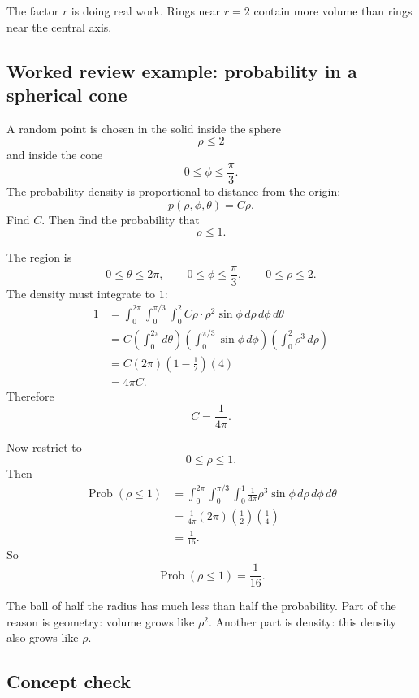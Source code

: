The factor \(r\) is doing real work.  Rings near \(r=2\) contain more volume than rings
near the central axis.

\subsection{Worked review example: probability in a spherical cone}

A random point is chosen in the solid inside the sphere
\[
    \rho\le2
\]
and inside the cone
\[
    0\le\phi\le\frac{\pi}{3}.
\]
The probability density is proportional to distance from the origin:
\[
    p(\rho,\phi,\theta)=C\rho.
\]
Find \(C\).  Then find the probability that
\[
    \rho\le1.
\]

The region is
\[
    0\le\theta\le2\pi,
    \qquad
    0\le\phi\le\frac{\pi}{3},
    \qquad
    0\le\rho\le2.
\]
The density must integrate to \(1\):
\[
\begin{aligned}
1
&=
\int_0^{2\pi}\int_0^{\pi/3}\int_0^2
C\rho\cdot \rho^2\sin\phi\,d\rho\,d\phi\,d\theta\\
&=
C
\left(\int_0^{2\pi}d\theta\right)
\left(\int_0^{\pi/3}\sin\phi\,d\phi\right)
\left(\int_0^2\rho^3\,d\rho\right)\\
&=
C(2\pi)\left(1-\frac12\right)(4)\\
&=
4\pi C.
\end{aligned}
\]
Therefore
\[
\boxed{
    C=\frac{1}{4\pi}.
}
\]

Now restrict to
\[
    0\le\rho\le1.
\]
Then
\[
\begin{aligned}
\operatorname{Prob}(\rho\le1)
&=
\int_0^{2\pi}\int_0^{\pi/3}\int_0^1
\frac{1}{4\pi}\rho^3\sin\phi\,d\rho\,d\phi\,d\theta\\
&=
\frac{1}{4\pi}(2\pi)\left(\frac12\right)\left(\frac14\right)\\
&=
\frac{1}{16}.
\end{aligned}
\]
So
\[
\boxed{
    \operatorname{Prob}(\rho\le1)=\frac{1}{16}.
}
\]

The ball of half the radius has much less than half the probability.  Part of the reason
is geometry: volume grows like \(\rho^2\).  Another part is density: this density also
grows like \(\rho\).

\subsection{Concept check}


